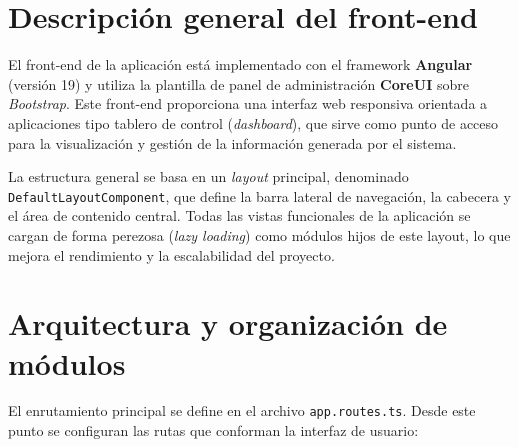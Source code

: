 
\section{Descripción general del front-end}

El front-end de la aplicación está implementado con el framework \textbf{Angular} (versión 19) y utiliza la plantilla de panel de administración \textbf{CoreUI} sobre \textit{Bootstrap}. Este front-end proporciona una interfaz web responsiva orientada a aplicaciones tipo tablero de control (\emph{dashboard}), que sirve como punto de acceso para la visualización y gestión de la información generada por el sistema.

La estructura general se basa en un \emph{layout} principal, denominado \texttt{DefaultLayoutComponent}, que define la barra lateral de navegación, la cabecera y el área de contenido central. Todas las vistas funcionales de la aplicación se cargan de forma perezosa (\emph{lazy loading}) como módulos hijos de este layout, lo que mejora el rendimiento y la escalabilidad del proyecto.

\section{Arquitectura y organización de módulos}

El enrutamiento principal se define en el archivo \texttt{app.routes.ts}. Desde este punto se configuran las rutas que conforman la interfaz de usuario:

